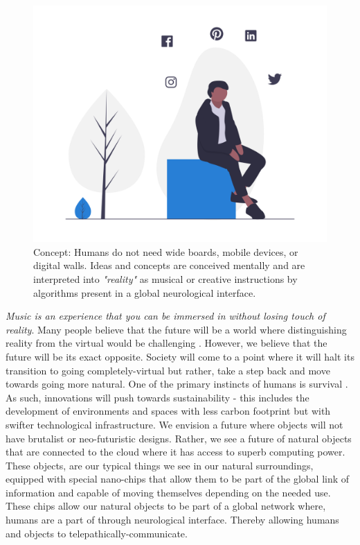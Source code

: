 \documentclass[acmtog]{acmart}
\begin{document}
\begin{figure}[h]
  \centering
  \includegraphics[width=\linewidth]{acmart-master-2/samples/think.png}
  \caption{Concept: Humans do not need wide boards, mobile devices, or digital walls. Ideas and concepts are conceived mentally and are interpreted into \textit{"reality"} as musical or creative instructions by algorithms present in a global neurological interface. }
\end{figure}

\textit{Music is an experience that you can be immersed in without losing touch of reality}. Many people believe that the future will be a world where distinguishing reality from the virtual would be challenging \cite{tamura2001mixed}. However, we believe that the future will be its exact opposite. Society will come to a point where it will halt its transition to going completely-virtual but rather, take a step back and move towards going more natural. One of the primary instincts of humans is survival \cite{khantzian1983self}. As such, innovations will push towards sustainability - this includes the development of environments and spaces with less carbon footprint but with swifter technological infrastructure. We envision a future where objects will not have brutalist or neo-futuristic designs. Rather, we see a future of natural objects that are connected to the cloud where it has access to superb computing power. These objects, are our typical things we see in our natural surroundings, equipped with special nano-chips that allow them to be part of the global link of information and capable of moving themselves depending on the needed use. These chips allow our natural objects to be part of a global network where, humans are a part of through neurological interface. Thereby allowing humans and objects to telepathically-communicate. 
\end{document}

